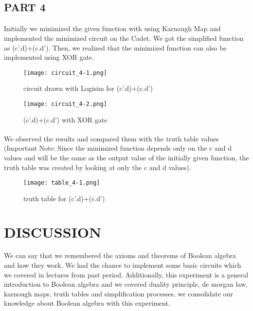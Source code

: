 \documentclass[pdftex,12pt,a4paper]{article}
\begin{document}
\begin{flushleft}
\subsection{PART 4}
\end{flushleft}

\paragraph{}
\begin{flushleft}
Initially we minimized the given function with using Karnaugh Map and implemented the minimized circuit on the Cadet. We got the simplified function as (c'.d)+(c.d'). Then, we realized that the minimized function can also be implemented using XOR gate.
\end{flushleft}
\begin{figure}[H]
    \centering
	\texttt{[image: circuit\_4-1.png]}
	\caption{circuit drawn with Logisim for (c'.d)+(c.d') }
	\label{fig6}
\end{figure}
\begin{figure}[H]
    \centering
	\texttt{[image: circuit\_4-2.png]}
	\caption{(c'.d)+(c.d') with XOR gate}
	\label{fig7}
\end{figure}
\begin{flushleft} %
\paragraph{}
We observed the results and compared them with the truth table values (Important Note: Since the minimized function depends only on the c and d values and will be the same as the output value of the initially given function, the truth table was created by looking at only the c and d values).
\end{flushleft}
\begin{figure}[H]
    \centering
	\texttt{[image: table\_4-1.png]}
	\caption{truth table for (c'.d)+(c.d')}
	\label{tbl6}
\end{figure}






\section{DISCUSSION}
\begin{flushleft}
\paragraph{}
We can say that we remembered the axioms and theorems of Boolean algebra and how they work. We had the chance to implement some basic circuits which we covered in lectures from past period. Additionally, this experiment is a general introduction to Boolean algebra and we covered duality principle, de morgan law, karnough maps, truth tables and simplification processes.  we consolidate our knowledge about Boolean algebra with this experiment.

\end{flushleft}
\end{document}
